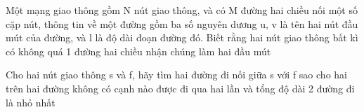 Một mạng giao thông gồm N nút giao thông, và có M đường hai chiều nối một số cặp nút, thông tin về một đường gồm ba số nguyên dương u, v là tên hai nút đầu mút của đường, và l là độ dài đoạn đường đó. Biết rằng hai nút giao thông bất kì có không quá 1 đường hai chiều nhận chúng làm hai đầu mút   


   Cho hai nút giao thông s và f, hãy tìm hai đường đi nối giữa s với f sao cho hai trên hai đường không có cạnh nào được đi qua hai lần và tổng độ dài 2 đường đi là nhỏ nhất